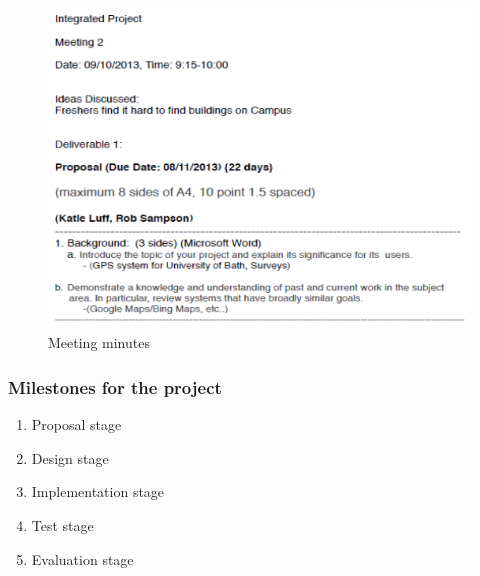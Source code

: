 \documentclass[10pt,a4paper,oneside]{report}
\begin{document}
\begin{figure}[H]
 \caption{Meeting minutes}
 \centering
 \includegraphics[keepaspectratio, scale=0.5]{meeting.png}
\end{figure}

\subsubsection*{Milestones for the project}
\begin{enumerate}
\item{Proposal stage}
\item{Design stage}
\item{Implementation stage}
\item{Test stage}
\item{Evaluation stage}
\end{enumerate}


\end{document}
